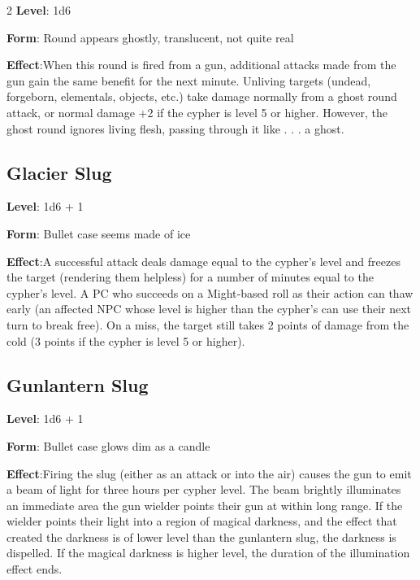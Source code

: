 \begin{multicols}{2}
\textbf{Level}: 1d6 

\textbf{Form}: Round appears ghostly, translucent, not quite real 

\textbf{Effect}:When this round is fired from a gun, additional attacks made from the gun gain the same benefit for the next minute. Unliving targets (undead, forgeborn, elementals, objects, etc.) take damage normally from a ghost round attack, or normal damage +2 if the cypher is level 5 or higher. However, the ghost round ignores living flesh, passing through it like . . . a ghost.

\subsection{Glacier Slug}

\textbf{Level}: 1d6 + 1 

\textbf{Form}: Bullet case seems made of ice 

\textbf{Effect}:A successful attack deals damage equal to the cypher’s level and freezes the target (rendering them helpless) for a number of minutes equal to the cypher’s level. A PC who succeeds on a Might‑based roll as their action can thaw early (an affected NPC whose level is higher than the cypher’s can use their next turn to break free). On a miss, the target still takes 2 points of damage from the cold (3 points if the cypher is level 5 or higher).

\subsection{Gunlantern Slug} 

\textbf{Level}: 1d6 + 1 

\textbf{Form}: Bullet case glows dim as a candle 

\textbf{Effect}:Firing the slug (either as an attack or into the air) causes the gun to emit a beam of light for three hours per cypher level. The beam brightly illuminates an immediate area the gun wielder points their gun at within long range. 
If the wielder points their light into a region of magical darkness, and the effect that created the darkness is of lower level than the gunlantern slug, the darkness is dispelled. If the magical darkness is higher level, the duration of the illumination effect ends.


\end{multicols}
